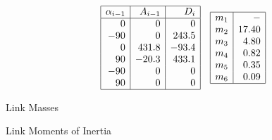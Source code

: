 \begin{align*}
  \begin{array}{|r|r|r|}
  \hline \alpha_{i-1} & A_{i-1} & D_{i} \\
  \hline 0 & 0 & 0 \\
  -90 & 0 & 243.5 \\
  0 & 431.8 & -93.4 \\
  90 & -20.3 & 433.1 \\
  -90 & 0 & 0 \\
  90 & 0 & 0 \\
  \hline
  \end{array}
  &&
  \begin{array}{|l|r|}
  \hline m_{1} & - \\
  m_{2} & 17.40 \\
  m_{3} & 4.80 \\
  m_{4} & 0.82 \\
  m_{5} & 0.35 \\
  m_{6} & 0.09 \\
  \hline
  \end{array}
\end{align*}

Link Masses

Link Moments of Inertia

